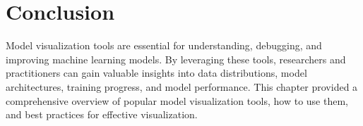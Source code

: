 \section{Conclusion}
Model visualization tools are essential for understanding, debugging, and improving machine learning models. By leveraging these tools, researchers and practitioners can gain valuable insights into data distributions, model architectures, training progress, and model performance. This chapter provided a comprehensive overview of popular model visualization tools, how to use them, and best practices for effective visualization.


% 
% 
